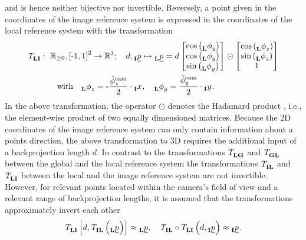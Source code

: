 and is hence neither bijective nor invertible.
Reversely, a point given in the coordinates of the image reference system is expressed
in the coordinates of the local reference system with the transformation
\begin{align} \label{eq:image_to_local_transformation}
    \trafo[]{}{\lrs\irs}{}{}
    &:\ 
    \mathbb{R}_{\ge 0}, \left[ \text{-}1, 1 \right]^2 \rightarrow \mathbb{R}^3
    ; \quad
    d, \pos[]{}{}{\irs}{} \mapsto \pos[]{}{}{\lrs}{}
    =
    d \begin{bmatrix}
        \cos \left( \ang[]{}{y}{\lrs}{} \right) \\
        \cos \left( \ang[]{}{y}{\lrs}{} \right) \\
        \sin \left( \ang[]{}{y}{\lrs}{} \right)
    \end{bmatrix} \odot \begin{bmatrix}
        \cos \left( \ang[]{}{z}{\lrs}{} \right) \\
        \sin \left( \ang[]{}{z}{\lrs}{} \right) \\
        1
    \end{bmatrix}
    \nonumber \\
    & \qquad \text{with} \quad
    \ang[]{}{z}{\lrs}{}
    = 
    \text - \frac{\ang[\user]{\camera}{z}{}{}}{2} \cdot \x[]{}{}{\irs}{}
    ,\quad 
    \ang[]{}{y}{\lrs}{}
    = 
    \frac{\ang[\user]{\camera}{y}{}{}}{2} \cdot \y[]{}{}{\irs}{}.
\end{align}
In the above transformation,
the operator 
$\odot$ 
denotes the Hadamard product
, i.e., the element-wise product of two equally dimensioned matrices.
Because the 2D coordinates of the image reference system
can only contain information about a points direction,
the above transformation to 3D requires the additional input of a backprojection length $d$.
In contrast to the transformations 
$\trafo[]{}{\lrs\grs}{}{}$
and 
$\trafo[]{}{\grs\lrs}{}{}$
between the global and the local reference system
the transformations 
$\trafo[]{}{\irs\lrs}{}{}$
and 
$\trafo[]{}{\lrs\irs}{}{}$
between the local and the image reference system
are not invertible.
However, for relevant points
located within the camera's field of view
and a relevant range of backprojection lengths,
it is assumed that the transformations approximately invert each other
\begin{equation}
    \trafo[]{}{\lrs\irs}{}{} \left[
        d, \trafo[]{}{\irs\lrs}{}{} \left( \pos[]{}{}{\lrs}{} \right)
    \right]
    \approx
    \pos[]{}{}{\lrs}{}
    ,\quad
    \trafo[]{}{\irs\lrs}{}{}
    \circ 
    \trafo[]{}{\lrs\irs}{}{} \left(
        d, \pos[]{}{}{\irs}{}
    \right)
    \approx
    \pos[]{}{}{\irs}{}.
\end{equation}





